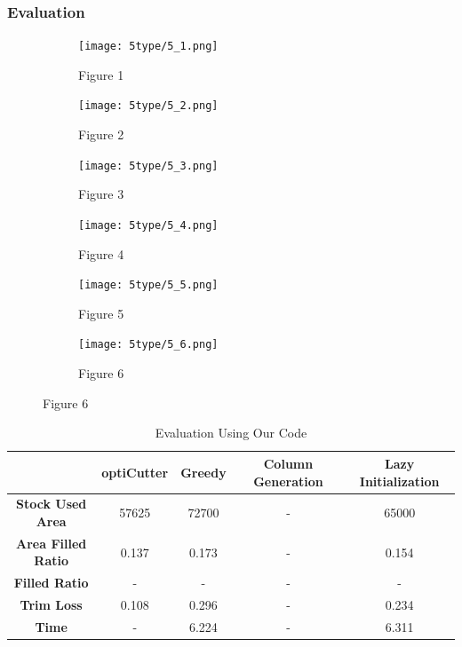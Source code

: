 \documentclass[a4paper]{article}
\begin{document}
\subsubsection*{Evaluation}
\begin{figure}[H] %
  \centering
  \begin{subfigure}[b]{0.48\textwidth}
    \centering
    \texttt{[image: 5type/5\_1.png]}
    \caption{Figure 1}
    \label{fig:1}
  \end{subfigure}
  \hfill
  \begin{subfigure}[b]{0.48\textwidth}
    \centering
    \texttt{[image: 5type/5\_2.png]}
    \caption{Figure 2}
    \label{fig:2}
  \end{subfigure}
  
  \vspace{0.3cm} %
  
  \begin{subfigure}[b]{0.48\textwidth}
    \centering
    \texttt{[image: 5type/5\_3.png]}
    \caption{Figure 3}
    \label{fig:3}
  \end{subfigure}
  \hfill
  \begin{subfigure}[b]{0.48\textwidth}
    \centering
    \texttt{[image: 5type/5\_4.png]}
    \caption{Figure 4}
    \label{fig:4}
  \end{subfigure}
  
  \vspace{0.3cm} %
  
  \begin{subfigure}[b]{0.48\textwidth}
    \centering
    \texttt{[image: 5type/5\_5.png]}
    \caption{Figure 5}
    \label{fig:5}
  \end{subfigure}
  \hfill
  \begin{subfigure}[b]{0.48\textwidth}
    \centering
    \texttt{[image: 5type/5\_6.png]}
    \caption{Figure 6}
    \label{fig:6}
  \end{subfigure}
                                                           
  \label{fig:all_images}
\end{figure}
\begin{table}[H]
        \centering
        \caption{Evaluation Using Our Code}
        \begin{tabular}{|c|c|c|c|c|}
            \hline
            \textbf{} & \textbf{optiCutter} & \textbf{Greedy} & \textbf{Column Generation} & \textbf{Lazy Initialization} \\ \hline
             \textbf{Stock Used Area} & 57625 & 72700 & - & 65000 \\ \hline
             \textbf{Area Filled Ratio} & 0.137 & 0.173 & - & 0.154 \\ \hline
            \textbf{Filled Ratio} & - & - & - & - \\ \hline
            \textbf{Trim Loss} & 0.108 & 0.296 & - & 0.234 \\ \hline
            \textbf{Time} & - & 6.224 & - & 6.311 \\ \hline
        \end{tabular}
    \end{table}
    
\end{document}
